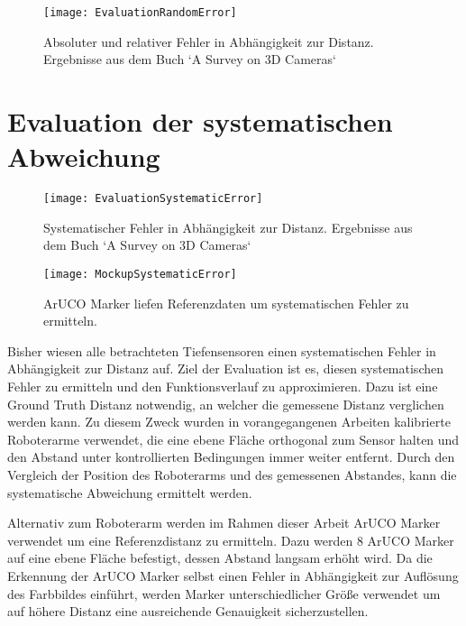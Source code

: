 \documentclass[thesis.tex]{subfiles}
\begin{document}
\begin{figure}[ht]
\centering
  \texttt{[image: EvaluationRandomError]}
  \label{fig:EvaluationRandomError}
  \caption{Absoluter und relativer Fehler in Abhängigkeit zur Distanz. Ergebnisse aus dem Buch `A Survey on 3D Cameras`}
\end{figure}

\newpage

\section{Evaluation der systematischen Abweichung}

\begin{figure}[ht]
\centering
  \texttt{[image: EvaluationSystematicError]}
  \label{fig:EvaluationSystematicError}
  \caption{Systematischer Fehler in Abhängigkeit zur Distanz. Ergebnisse aus dem Buch `A Survey on 3D Cameras`}
\end{figure}

\begin{figure}[ht]
\centering
  \texttt{[image: MockupSystematicError]}
  \label{fig:MockupSystematicError}
  \caption{ArUCO Marker liefen Referenzdaten um systematischen Fehler zu ermitteln.}
\end{figure}

Bisher wiesen alle betrachteten Tiefensensoren einen systematischen Fehler in Abhängigkeit zur Distanz auf. Ziel der Evaluation ist es, diesen systematischen Fehler zu ermitteln und den Funktionsverlauf zu approximieren. Dazu ist eine Ground Truth Distanz notwendig, an welcher die gemessene Distanz verglichen werden kann. Zu diesem Zweck wurden in vorangegangenen Arbeiten kalibrierte Roboterarme verwendet, die eine ebene Fläche orthogonal zum Sensor halten und den Abstand unter kontrollierten Bedingungen immer weiter entfernt. Durch den Vergleich der Position des Roboterarms und des gemessenen Abstandes, kann die systematische Abweichung ermittelt werden. 

Alternativ zum Roboterarm werden im Rahmen dieser Arbeit ArUCO Marker verwendet um eine Referenzdistanz zu ermitteln. Dazu werden 8 ArUCO Marker auf eine ebene Fläche befestigt, dessen Abstand langsam erhöht wird. Da die Erkennung der ArUCO Marker selbst einen Fehler in Abhängigkeit zur Auflösung des Farbbildes einführt, werden Marker unterschiedlicher Größe verwendet um auf höhere Distanz eine ausreichende Genauigkeit sicherzustellen.
\end{document}
